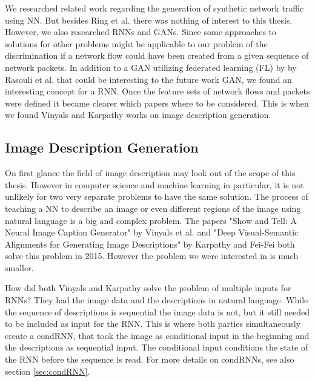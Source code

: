 \documentclass[
	ngerman,
	ruledheaders=section,%
	class=report,%
	thesis={type=bachelor},%
	accentcolor=9c,%
	custommargins=true,%
	marginpar=false,%
	parskip=half-,%
	fontsize=11pt,%
]{tudapub}
\begin{document}
We researched related work regarding the generation of synthetic network traffic using NN.
But besides Ring et al. there was nothing of interest to this thesis.
However, we also researched RNNs and GANs.
Since some approaches to solutions for other problems might be applicable to our problem of
the discrimination if a network flow could have been created from a given sequence of network packets.
In addition to a GAN utilizing federated learning (FL) by by Rasouli et al. \cite{rasouliFedGANFederatedGenerative2020} that could be interesting to the future work GAN, we found an interesting concept for a RNN.
Once the feature sets of network flows and packets were defined it became clearer which papers where to be considered.
This is when we found Vinyals \cite{vinyalsShowTellNeural2015} and Karpathy \cite{karpathyDeepVisualSemanticAlignments2015} works on image description generation.



\subsection{Image Description Generation}
\label{sec:imagedesc}

On first glance the field of image description may look out of the scope of this thesis.
However in computer science and machine learning in particular, it is not unlikely for two very separate problems to have the same solution.
The process of teaching a NN to describe an image or even different regions of the image using natural language is a big and complex problem.
The papers "Show and Tell: A Neural Image Caption Generator" by Vinyals et al. \cite{vinyalsShowTellNeural2015} and "Deep Visual-Semantic Alignments for Generating Image Descriptions" by Karpathy and Fei-Fei \cite{karpathyDeepVisualSemanticAlignments2015} both solve this problem in 2015.
However the problem we were interested in is much smaller.

How did both Vinyals and Karpathy solve the problem of multiple inputs for RNNs?
They had the image data and the descriptions in natural language.
While the sequence of descriptions is sequential the image data is not, but it still needed to be included as input for the RNN.
This is where both parties simultaneously create a condRNN, that took the image as conditional input in the beginning and the descriptions as sequential input.
The conditional input conditions the state of the RNN before the sequence is read.
For more details on condRNNs, see also section \ref{sec:condRNN}.
\end{document}
